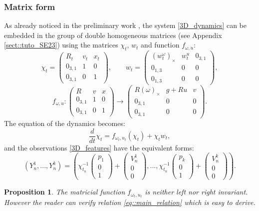 \documentclass[a4paper,12pt,onecolumn]{article}
\newtheorem{prop}{Proposition}
\begin{document}
\subsubsection{Matrix form}
As already noticed in the preliminary work \cite{barrau-bonnabel-cdc14}, the system \eqref{3D_dynamics} can be embedded in the group of double homogeneous matrices (see Appendix \ref{sect::tuto_SE23}) using the matrices $\chi_t$, $w_t$ and function $f_{\omega,u}$:
\[
\chi_t = \begin{pmatrix} R_t & v_t & x_t \\ 0_{3,1} & 1 & 0 \\ 0_{3,1} & 0 & 1 \end{pmatrix}, \qquad w_t = \begin{pmatrix} (w_t^\omega)_\times & w_t^u & 0_{3,1} \\
0_{1,3} & 0 & 0 \\
0_{1,3} & 0 & 0 \end{pmatrix},
\]
\[
f_{\omega,u}: \begin{pmatrix} R & v & x \\ 0_{3,1} & 1 & 0 \\ 0_{3,1} & 0 & 1 \end{pmatrix} \rightarrow \begin{pmatrix} R(\omega)_\times & g + Ru & v \\ 0_{3,1} & 0 & 0 \\ 0_{3,1} & 0 & 0 \end{pmatrix}.
\]
The equation of the dynamics becomes:
\begin{equation}
\frac{d}{dt} \chi_t = f_{\omega_t,u_t}(\chi_t) + \chi_t w_t, \label{eq::3D_matrix_dynamique}
\end{equation}
and the observations \eqref{3D_features} have the equivalent forms:
\begin{equation}
(Y_n^1,...,Y_n^k) = \left( \chi_{t_n}^{-1} \begin{pmatrix} p_1 \\ 0 \\ 1 \end{pmatrix} +\begin{pmatrix}  V_n^1\\ 0 \\ 0 \end{pmatrix}, ...,  \chi_{t_n}^{-1} \begin{pmatrix} p_k \\ 0 \\ 1 \end{pmatrix} +\begin{pmatrix}  V_n^k\\ 0 \\ 0 \end{pmatrix}  \right) . \label{eq::3D_matrix_features}
\end{equation}
\begin{prop}
The matricial function $f_{\omega_t, u_t}$ is neither left nor right invariant. However the reader can verify relation \eqref{eq::main_relation}  which is easy to derive.
\end{prop}
\end{document}
